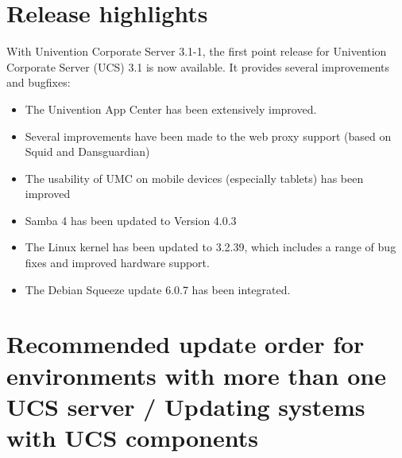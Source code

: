 


\newcommand{\ucsManualTitle}{UCS 3.1-1 Release Notes}
\newcommand{\ucsManualSubtitle}{Release notes for the installation and update of Univention Corporate Server (UCS) 3.1-1}
\newcommand{\ucsManualVersion}{3.1-1}
\newcommand{\ucsTechAuthor}{ & Univention GmbH & feedback@univention.de}

\setcounter{secnumdepth}{3}
\setcounter{tocdepth}{3}



\chapter{Release highlights}

With Univention Corporate Server 3.1-1, the first point release for
Univention Corporate Server (UCS) 3.1 is now available. It provides
several improvements and bugfixes:

\begin{itemize}
\item The Univention App Center has been extensively improved.
\item Several improvements have been made to the web proxy support
(based on Squid and  Dansguardian)
\item The usability of UMC on mobile devices (especially tablets) has been
  improved
\item Samba 4 has been updated to Version 4.0.3
\item The Linux kernel has been updated to 3.2.39, which includes a range of bug fixes and improved hardware support.
\item The Debian Squeeze update 6.0.7 has been integrated.
\end{itemize}

\chapter{Recommended update order for environments with more than one UCS server / Updating systems with UCS components}

